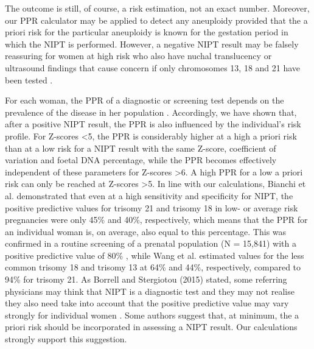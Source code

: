 The outcome is still, of course, a risk estimation, not an exact number. Moreover, our PPR calculator may be applied to detect any aneuploidy provided that the a priori risk for the particular aneuploidy is known for the gestation period in which the NIPT is performed. 
However, a negative NIPT result may be falsely reassuring for women at high risk who also have nuchal translucency or ultrasound findings that cause concern if only chromosomes 13, 18 and 21 have been tested \cite{Smith_2014}.

For each woman, the PPR of a diagnostic or screening test depends on the prevalence of the disease in her population \cite{Lalkhen_2008}. 
Accordingly, we have shown that, after a positive NIPT result, the PPR is also influenced by the individual’s risk profile. 
For Z-scores \textless 5, the PPR is considerably higher at a high a priori risk than at a low risk for a NIPT result with the same Z-score, coefficient of variation and foetal DNA percentage, while the PPR becomes effectively independent of these parameters for Z-scores \textgreater 6. 
A high PPR for a low a priori risk can only be reached at Z-scores \textgreater 5. 
In line with our calculations, Bianchi et al. \cite{Bianchi_2014} demonstrated that even at a high sensitivity and specificity for NIPT, the positive predictive values for trisomy 21 and trisomy 18 in low- or average risk pregnancies were only 45\% and 40\%, respectively, which means that the PPR for an individual woman is, on average, also equal to this percentage. 
This was confirmed in a routine screening of a prenatal population (N = 15,841) with a positive predictive value of 80\% \cite{Norton_2015}, while Wang et al. \cite{Wang_2014b} estimated values for the less common trisomy 18 and trisomy 13 at 64\% and 44\%, respectively, compared to 94\% for trisomy 21. 
As Borrell and Stergiotou (2015) stated, some referring physicians may think that NIPT is a diagnostic test and they may not realise they also need take into account that the positive predictive value may vary strongly for individual women \cite{Borrell_2015}. 
Some authors \cite{Morain_2013,Sparks_2012a} suggest that, at minimum, the a priori risk should be incorporated in assessing a NIPT result. 
Our calculations strongly support this suggestion.

